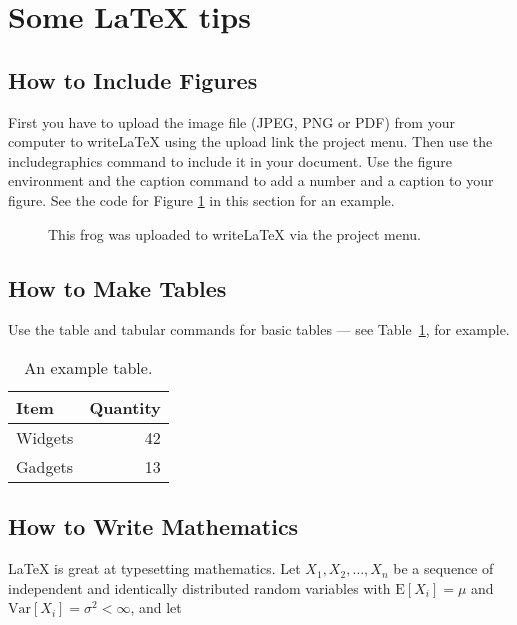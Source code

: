 \documentclass[a4paper]{article}
\begin{document}
      \section{Some LaTeX tips}
      \label{sec:latex}
      \subsection{How to Include Figures}
      
      First you have to upload the image file (JPEG, PNG or PDF) from your computer to writeLaTeX using the upload link the project menu. Then use the includegraphics command to include it in your document. Use the figure environment and the caption command to add a number and a caption to your figure. See the code for Figure \ref{fig:frog} in this section for an example.
      
      \begin{figure}
      \centering
      \caption{\label{fig:frog}This frog was uploaded to writeLaTeX via the project menu.}
      \end{figure}
      
      \subsection{How to Make Tables}
      
      Use the table and tabular commands for basic tables --- see Table~\ref{tab:widgets}, for example.
      
      \begin{table}
      \centering
      \begin{tabular}{l|r}
      Item & Quantity \\\hline
      Widgets & 42 \\
      Gadgets & 13
      \end{tabular}
      \caption{\label{tab:widgets}An example table.}
      \end{table}
      
      \subsection{How to Write Mathematics}
      
      \LaTeX{} is great at typesetting mathematics. Let $X_1, X_2, \ldots, X_n$ be a sequence of independent and identically distributed random variables with $\text{E}[X_i] = \mu$ and $\text{Var}[X_i] = \sigma^2 < \infty$, and let
      
\end{document}
